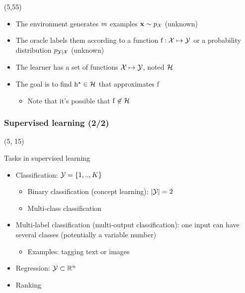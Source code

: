 \begin{frame}
  \begin{textblock}{90}(5,55)
    \begin{itemize}
    \item The environment generates $m$ examples
      $\mathbf{x} \sim p_{\mathcal{X}}$ (unknown)
    \item The oracle labels them according to a function $\mathrm{f}: \mathcal{X}
      \mapsto \mathcal{Y}$ or a probability distribution $p_{\mathcal{Y} | \mathcal{X}}$ (unknown)
    \item The learner has a set of functions $\mathcal{X}
      \mapsto \mathcal{Y}$, noted $\mathcal{H}$
    \item The goal is to find $\mathrm{h}^{\star} \in \mathcal{H}$ that approximates
      $\mathrm{f}$
      \begin{itemize}
      \item Note that it's possible that $\mathrm{f} \not\in \mathcal{H}$
      \end{itemize}
    \end{itemize}
  \end{textblock}
\end{frame}


\begin{frame}
  \frametitle{Supervised learning (2/2)}

  \begin{textblock}{90}(5, 15)
    \begin{block}{Tasks in supervised learning}
      \begin{itemize}
      \item Classification: $\mathcal{Y} = \left \lbrace {1,..,K} \right \rbrace$
        \begin{itemize}
        \item Binary classification (concept learning): $\left | \mathcal{Y} \right | = 2$
        \item Multi-class classification
        \end{itemize}
      \item Multi-label classification (multi-output classification): one input can have
        several classes (potentially a variable number)
        \begin{itemize}
        \item Examples: tagging text or images
        \end{itemize}
      \item Regression: $\mathcal{Y} \subset \mathbb{R}^n$
      \item Ranking
      \end{itemize}
    \end{block}
  \end{textblock}
\end{frame}


